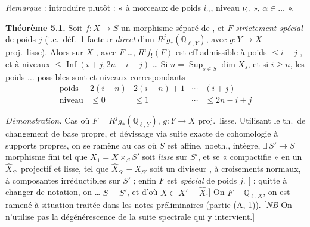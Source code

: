 \documentclass[11pt,a4paper]{article}
\begin{document}
\emph{Remarque} : introduire plutôt : « à morceaux de poids $i_{\alpha}$,
niveau $\nu_{\alpha}$ », $\alpha \in \ldots$ ».

\textbf{Théorème 5.1.} Soit $f : X \to S$ un morphisme séparé de
 , et $F$ 
\emph{strictement spécial} de poids $j$  (i.e.\ déf.\ 1  facteur \emph{direct} d'un
$R^{j}g_{*}(\mathbb{Q}_{\ell,Y})$, avec $g : Y \to X$ proj.\ lisse). Alors
\struck{\ill{}} sur $X$ \struck{\ill{}} , avec $F$
…, $R^{i}f_{!}(F)$ est eff admissible \struck{\ill{}} à poids
$\leqslant i + j$ \struck{\ill{}}, et à niveaux $\leqslant
\operatorname{Inf}(i+j, 2n-i+j)$ …
 Si $n = \operatorname{Sup}_{s \in S} \dim X_{s}$, et si
$i \geqslant n$, les poids $\ldots$ possibles sont et niveaux correspondants
\[
\begin{array}{c|c|c|c|c}
\text{poids} & 2(i-n) & 2(i-n)+1 & \cdots & (i+j) \\
\hline
\text{niveau} & \leqslant 0 & \leqslant 1 & \cdots & \leqslant 2n-i+j
\end{array}
\]

\emph{Démonstration.} Cas  où $F = R^{j}g_{*}(\mathbb{Q}_{\ell,Y})$,
$g : Y \to X$ proj.\ lisse. Utilisant le th.\ de changement de base propre,
\struck{\ill{}} et dévissage via suite exacte de cohomologie à supports
propres, on se ramène au cas où  $S$ est affine,
noeth., intègre, $\exists\, S' \to S$ morphisme fini 
 tel que $X_{1} = X \times_{S} S'$ soit \emph{lisse} sur
$S'$, et se « compactifie » en un $\widehat{X}_{S'}$ 
projectif et lisse, tel que $\widehat{X}_{S'} - X_{S'}$ soit un diviseur
, à croisements normaux, à composantes irréductibles
 sur $S'$ ; enfin $F$ \struck{\ill{}} est \emph{spécial}
de poids $j$. [ : quitte à changer de notation, on
 … $S = S'$, et d'où $X \subset X' = \widehat{X}$.]
On  $F = \mathbb{Q}_{\ell,X}$, on est ramené à
 situation traitée dans les notes préliminaires (partie
(A, 1)). [\emph{NB} On n'utilise pas la dégénérescence de la suite
spectrale qui y intervient.]
\end{document}
